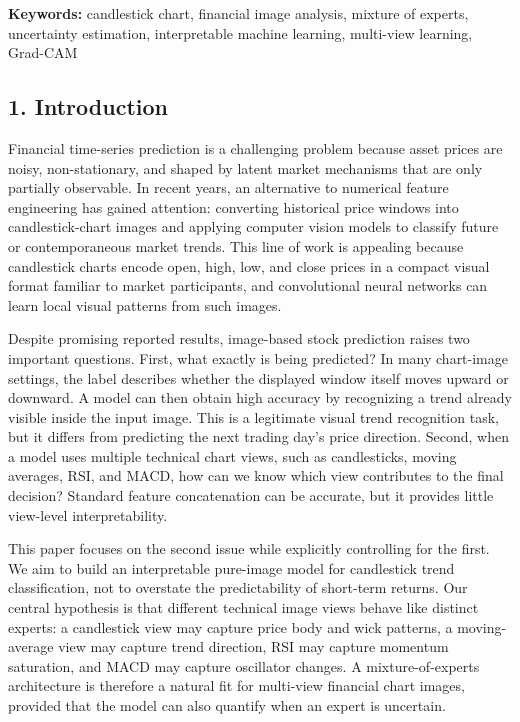 \documentclass[
]{article}
\begin{document}
\textbf{Keywords:} candlestick chart, financial image analysis, mixture
of experts, uncertainty estimation, interpretable machine learning,
multi-view learning, Grad-CAM

\subsection{1. Introduction}\label{introduction}

Financial time-series prediction is a challenging problem because asset
prices are noisy, non-stationary, and shaped by latent market mechanisms
that are only partially observable. In recent years, an alternative to
numerical feature engineering has gained attention: converting
historical price windows into candlestick-chart images and applying
computer vision models to classify future or contemporaneous market
trends. This line of work is appealing because candlestick charts encode
open, high, low, and close prices in a compact visual format familiar to
market participants, and convolutional neural networks can learn local
visual patterns from such images.

Despite promising reported results, image-based stock prediction raises
two important questions. First, what exactly is being predicted? In many
chart-image settings, the label describes whether the displayed window
itself moves upward or downward. A model can then obtain high accuracy
by recognizing a trend already visible inside the input image. This is a
legitimate visual trend recognition task, but it differs from predicting
the next trading day's price direction. Second, when a model uses
multiple technical chart views, such as candlesticks, moving averages,
RSI, and MACD, how can we know which view contributes to the final
decision? Standard feature concatenation can be accurate, but it
provides little view-level interpretability.

This paper focuses on the second issue while explicitly controlling for
the first. We aim to build an interpretable pure-image model for
candlestick trend classification, not to overstate the predictability of
short-term returns. Our central hypothesis is that different technical
image views behave like distinct experts: a candlestick view may capture
price body and wick patterns, a moving-average view may capture trend
direction, RSI may capture momentum saturation, and MACD may capture
oscillator changes. A mixture-of-experts architecture is therefore a
natural fit for multi-view financial chart images, provided that the
model can also quantify when an expert is uncertain.
\end{document}
